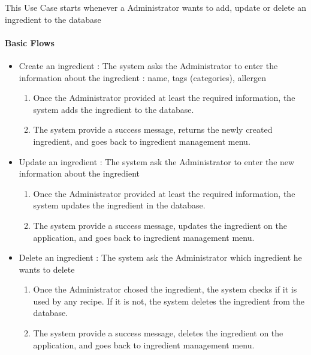 {
  This Use Case starts whenever a Administrator wants to add, update or delete an ingredient to the database

  \paragraph{Basic Flows}
    \begin{itemize}
      \item Create an ingredient : The system asks the Administrator to enter the information about the ingredient : name, tags (categories), allergen 
      \begin{enumerate}
        \item Once the Administrator provided at least the required information, the system adds the ingredient to the database.
        \item The system provide a success message, returns the newly created ingredient, and goes back to ingredient management menu.
      \end{enumerate}
      \item Update an ingredient : The system ask the Administrator to enter  the new information about the ingredient
      \begin{enumerate}
        \item Once the Administrator provided at least the required information, the system updates the ingredient in the database.
        \item The system provide a success message, updates the ingredient on the application, and goes back to ingredient management menu.
      \end{enumerate}
      \item Delete an ingredient : The system ask the Administrator which ingredient he wants to delete
      \begin{enumerate}
        \item Once the Administrator chosed the ingredient, the system checks if it is used by any recipe. If it is not, the system deletes the ingredient from the database.
        \item The system provide a success message, deletes the ingredient on the application, and goes back to ingredient management menu.
      \end{enumerate}
    \end{itemize}
}
